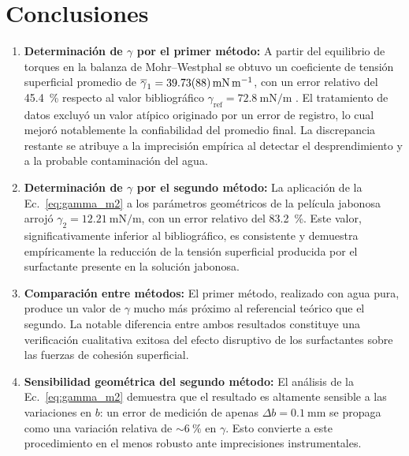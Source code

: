 
\section{Conclusiones}
\label{sec:conclusiones}

\begin{enumerate}

    \item \textbf{Determinación de $\gamma$ por el primer método:} A
    partir del equilibrio de torques en la balanza de Mohr--Westphal se
    obtuvo un coeficiente de tensión superficial promedio de
    $\overline{\gamma}_1 = \qty{39.73 \pm 0.88}{\milli\newton\per\meter}$,
    con un error relativo del \qty{45.4}{\percent} respecto al valor
    bibliográfico $\gamma_{\text{ref}} = \qty{72.8}{\milli\newton\per\meter}$
    \cite{serway}. El tratamiento de datos excluyó un valor atípico originado 
    por un error de registro, lo cual mejoró notablemente la confiabilidad 
    del promedio final. La discrepancia restante se atribuye a
    la imprecisión empírica al detectar el desprendimiento y a la probable 
    contaminación del agua.

    \item \textbf{Determinación de $\gamma$ por el segundo método:} La
    aplicación de la Ec.~\eqref{eq:gamma_m2} a los parámetros geométricos
    de la película jabonosa arrojó
    $\gamma_2 = \qty{12.21}{\milli\newton\per\meter}$, con un error
    relativo del \qty{83.2}{\percent}. Este valor, significativamente
    inferior al bibliográfico, es consistente y demuestra empíricamente la
    reducción de la tensión superficial producida por el surfactante presente
    en la solución jabonosa.

    \item \textbf{Comparación entre métodos:} El primer método, realizado
    con agua pura, produce un valor de $\gamma$ mucho más próximo al
    referencial teórico que el segundo. La notable diferencia entre ambos
    resultados constituye una verificación cualitativa exitosa del efecto
    disruptivo de los surfactantes sobre las fuerzas de cohesión superficial.

    \item \textbf{Sensibilidad geométrica del segundo método:} El
    análisis de la Ec.~\eqref{eq:gamma_m2} demuestra que el resultado es
    altamente sensible a las variaciones en $b$: un error de medición de
    apenas $\Delta b = \qty{0.1}{\milli\meter}$ se propaga como una variación
    relativa de $\sim\qty{6}{\percent}$ en $\gamma$. Esto convierte a este
    procedimiento en el menos robusto ante imprecisiones instrumentales.


\end{enumerate}
